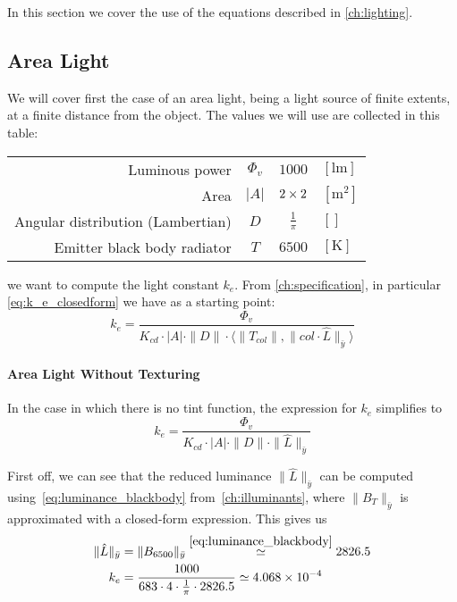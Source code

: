 In this section we cover the use of the equations described in \cref{ch:lighting}.

\subsection{Area Light}
We will cover first the case of an area light, being a light source of finite
extents, at a finite distance from the object.
The values we will use are collected in this table:

\vskip 2mm
\begin{center}
	\begin{tabular}{r c c l}
		Luminous power                    & $\Phi_v$ & $\num{1000}$ & $[\unit{\lumen}]$ \\
		Area                              & $|A|$ & $\numproduct{2 x 2}$ & $[\unit{\square\meter}]$ \\
		Angular distribution (Lambertian) & $D$ & $\frac1{\pi}$ & $[]$ \\
		Emitter black body radiator       & $T$ & $\num{6500}$ & $[\unit{\kelvin}]$ \\
	\end{tabular}
\end{center}

\vskip 2mm

we want to compute the light constant $k_e$. 
From \cref{ch:specification}, in particular \cref{eq:k_e_closedform} we have as a starting point:
\begin{displaymath}
 k_e = \frac{\Phi_v}{K_{cd} \cdot |A| \cdot \|D\| \cdot \langle \|T_{col}\|, \|col\cdot\hat{L}\|_{\bar y} \rangle }
\end{displaymath}

\paragraph{Area Light Without Texturing} 
In the case in which there is no tint function, the expression for $k_e$ simplifies to
\begin{displaymath}
k_e = \frac{\Phi_v}{K_{cd} \cdot |A| \cdot \|D\| \cdot \|\hat{L}\|_{\bar y} }
\end{displaymath}

First off, we can see that the reduced luminance $\|\hat{L}\|_{\bar y}$ can be computed using~\cref{eq:luminance_blackbody} from~\cref{ch:illuminants}, 
where $\|B_T\|_{\bar y}$ is approximated with a closed-form expression. 
This gives us
\begin{align*}
\|\hat{L}\|_{\bar y} &= \|B_{6500}\|_{\bar y} \stackrel{\eqref{eq:luminance_blackbody}}{\simeq} 2826.5 \\
k_e &= \frac{1000}{683 \cdot 4 \cdot \frac1\pi \cdot 2826.5 } \simeq 4.068 \times 10^{-4}
\end{align*}

